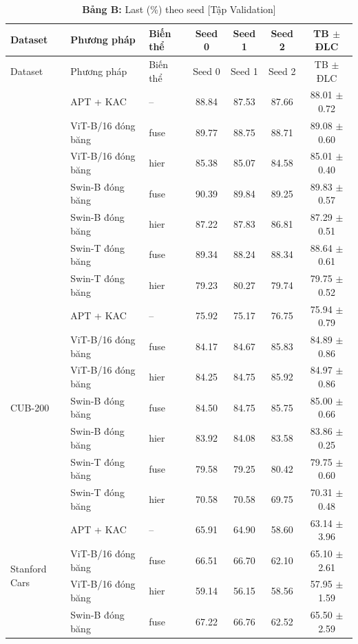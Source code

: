 \documentclass[10pt,a4paper]{article}
\begin{document}
{\small
\setlength{\tabcolsep}{5pt}
\begin{longtable}{lllcccc}
\caption{\textbf{Bảng B:} Last (\%) theo seed [Tập Validation]}\\
\toprule
Dataset & Phương pháp & Biến thể & Seed 0 & Seed 1 & Seed 2 & TB $\pm$ ĐLC \\
\midrule
\endfirsthead
\toprule
Dataset & Phương pháp & Biến thể & Seed 0 & Seed 1 & Seed 2 & TB $\pm$ ĐLC \\
\midrule
\endhead
\bottomrule
\endfoot
\multirow{7}{*}{CIFAR-100} & APT + KAC & -- & 88.84 & 87.53 & 87.66 & 88.01 $\pm$ 0.72 \\
 & ViT-B/16 đóng băng & fuse & 89.77 & 88.75 & 88.71 & 89.08 $\pm$ 0.60 \\
 & ViT-B/16 đóng băng & hier & 85.38 & 85.07 & 84.58 & 85.01 $\pm$ 0.40 \\
 & Swin-B đóng băng & fuse & 90.39 & 89.84 & 89.25 & 89.83 $\pm$ 0.57 \\
 & Swin-B đóng băng & hier & 87.22 & 87.83 & 86.81 & 87.29 $\pm$ 0.51 \\
 & Swin-T đóng băng & fuse & 89.34 & 88.24 & 88.34 & 88.64 $\pm$ 0.61 \\
 & Swin-T đóng băng & hier & 79.23 & 80.27 & 79.74 & 79.75 $\pm$ 0.52 \\
\midrule
\multirow{7}{*}{CUB-200} & APT + KAC & -- & 75.92 & 75.17 & 76.75 & 75.94 $\pm$ 0.79 \\
 & ViT-B/16 đóng băng & fuse & 84.17 & 84.67 & 85.83 & 84.89 $\pm$ 0.86 \\
 & ViT-B/16 đóng băng & hier & 84.25 & 84.75 & 85.92 & 84.97 $\pm$ 0.86 \\
 & Swin-B đóng băng & fuse & 84.50 & 84.75 & 85.75 & 85.00 $\pm$ 0.66 \\
 & Swin-B đóng băng & hier & 83.92 & 84.08 & 83.58 & 83.86 $\pm$ 0.25 \\
 & Swin-T đóng băng & fuse & 79.58 & 79.25 & 80.42 & 79.75 $\pm$ 0.60 \\
 & Swin-T đóng băng & hier & 70.58 & 70.58 & 69.75 & 70.31 $\pm$ 0.48 \\
\midrule
\multirow{7}{*}{Stanford Cars} & APT + KAC & -- & 65.91 & 64.90 & 58.60 & 63.14 $\pm$ 3.96 \\
 & ViT-B/16 đóng băng & fuse & 66.51 & 66.70 & 62.10 & 65.10 $\pm$ 2.61 \\
 & ViT-B/16 đóng băng & hier & 59.14 & 56.15 & 58.56 & 57.95 $\pm$ 1.59 \\
 & Swin-B đóng băng & fuse & 67.22 & 66.76 & 62.52 & 65.50 $\pm$ 2.59 \\

\end{longtable}}
\end{document}
